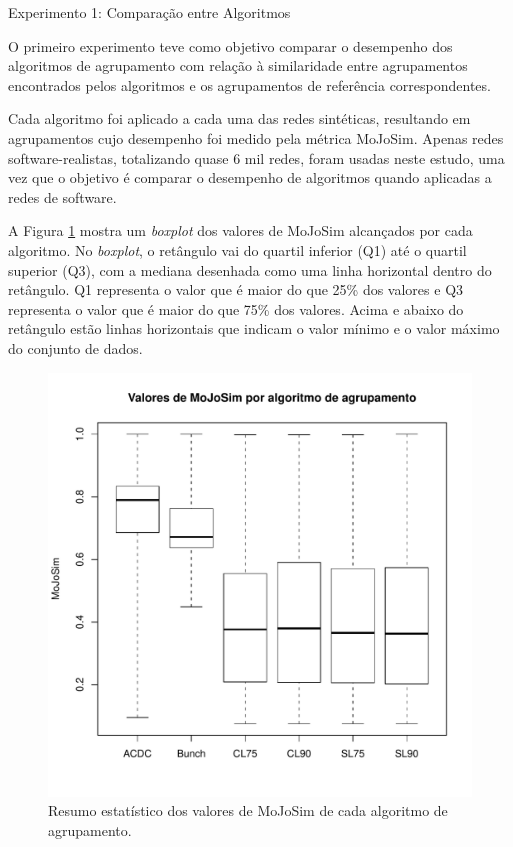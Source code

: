 \begin{section}{Experimento 1: Comparação entre Algoritmos}

O primeiro experimento teve como objetivo comparar o desempenho dos algoritmos de agrupamento com relação à similaridade entre agrupamentos encontrados pelos algoritmos e os agrupamentos de referência correspondentes.

Cada algoritmo foi aplicado a cada uma das redes sintéticas, resultando em agrupamentos cujo desempenho foi medido pela métrica MoJoSim. Apenas redes software-realistas, totalizando quase 6 mil redes, foram usadas neste estudo, uma vez que o objetivo é comparar o desempenho de algoritmos quando aplicadas a redes de software.

A Figura \ref{fig:box-mojo-por-alg} mostra um \emph{boxplot} dos valores de MoJoSim alcançados por cada algoritmo. No \emph{boxplot}, o retângulo vai do quartil inferior (Q1) até o quartil superior (Q3), com a mediana desenhada como uma linha horizontal dentro do retângulo. Q1 representa o valor que é maior do que 25\% dos valores e Q3 representa o valor que é maior do que 75\% dos valores. Acima e abaixo do retângulo estão linhas horizontais que indicam o valor mínimo e o valor máximo do conjunto de dados. %

\begin{figure}[htbp]
	\centering
		\includegraphics[scale=0.5]{figuras/box-mojo-por-alg}
	\caption{Resumo estatístico dos valores de MoJoSim de cada algoritmo de agrupamento.}
	\label{fig:box-mojo-por-alg}
\end{figure}


\end{section}
